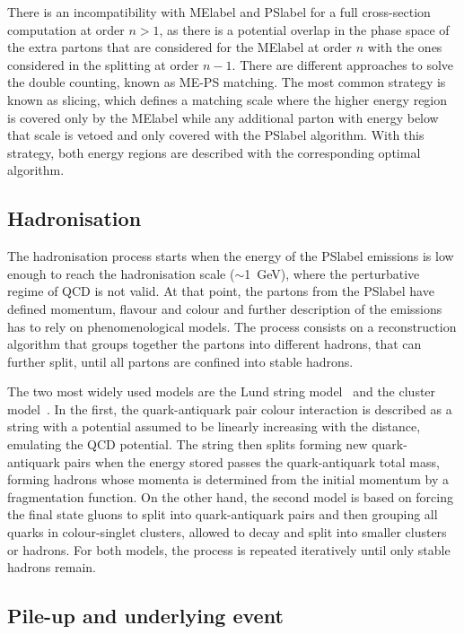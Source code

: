 There is an incompatibility with \acrshort{MElabel} and \acrshort{PSlabel} for a full cross-section computation at order $n>1$, as there is a potential overlap in the phase space of the extra partons that are considered for the \acrshort{MElabel} at order $n$ with the ones considered in the splitting at order $n-1$. There are different approaches to solve the double counting, known as ME-PS matching. The most common strategy is known as slicing, which defines a matching scale where the higher energy region is covered only by the \acrshort{MElabel} while any additional parton with energy below that scale is vetoed and only covered with the \acrshort{PSlabel} algorithm. With this strategy, both energy regions are described with the corresponding optimal algorithm.

\subsection{Hadronisation}

The hadronisation process starts when the energy of the \acrshort{PSlabel} emissions is low enough to reach the hadronisation scale ($\sim$1~GeV), where the perturbative regime of \acrshort{QCD} is not valid. At that point, the partons from the \acrshort{PSlabel} have defined momentum, flavour and colour and further description of the emissions has to rely on phenomenological models. The process consists on a reconstruction algorithm that groups together the partons into different hadrons, that can further split, until all partons are confined into stable hadrons. 

The two most widely used models are the Lund string model~\cite{ANDERSSON198331} and the cluster model~\cite{Winter2004}.
In the first, the quark-antiquark pair colour interaction is described as a string with a potential assumed to be linearly increasing with the distance, emulating the \acrshort{QCD} potential. The string then splits forming new quark-antiquark pairs when the energy stored passes the quark-antiquark total mass, forming hadrons whose momenta is determined from the initial momentum by a fragmentation function. On the other hand, the second model is based on forcing the final state gluons to split into quark-antiquark pairs and then grouping all quarks in colour-singlet clusters, allowed to decay and split into smaller clusters or hadrons. For both models, the process is repeated iteratively until only stable hadrons remain.

\subsection{Pile-up and underlying event}

